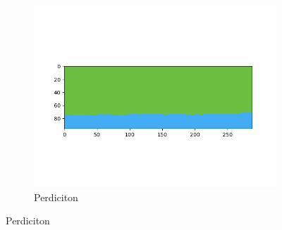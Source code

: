 \documentclass[10pt,twocolumn,letterpaper]{article}
\begin{document}
\begin{figure}[hpt]
\begin{center}
\begin{subfigure}{0.3\textwidth}
  		\includegraphics[width=\linewidth,trim={1.25cm 1.5cm 1.5cm 1.25cm},clip]{perdiction2.png}
  		\caption{Perdiciton}
  \end{subfigure}
  

\end{center}
\end{figure}
\end{document}
